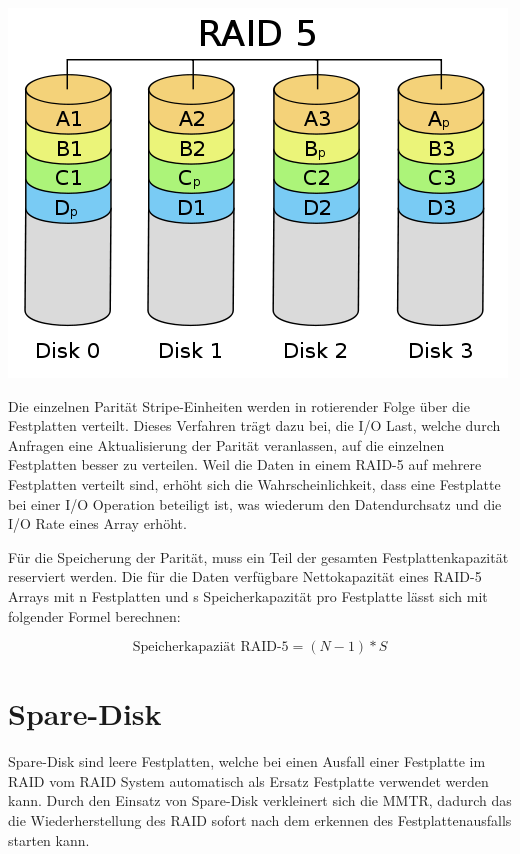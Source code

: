 \begin{center}
\includegraphics[width=\linewidth, keepaspectratio = true]{media/Raid-5.png}
\end{center}

Die einzelnen Parität Stripe-Einheiten werden in rotierender Folge über die Festplatten verteilt. Dieses Verfahren trägt dazu bei, die I/O Last, welche durch Anfragen eine Aktualisierung der Parität veranlassen, auf die einzelnen Festplatten besser zu verteilen. Weil die Daten in einem RAID-5 auf mehrere Festplatten verteilt sind, erhöht sich die Wahrscheinlichkeit, dass eine Festplatte bei einer I/O Operation beteiligt ist, was wiederum den Datendurchsatz und die I/O Rate eines Array erhöht. \cite{Kuratti1995}

Für die Speicherung der Parität, muss ein Teil der gesamten Festplattenkapazität reserviert werden. Die für die Daten verfügbare Nettokapazität eines RAID-5 Arrays mit n Festplatten und s Speicherkapazität pro Festplatte lässt sich mit folgender Formel \cite{Kuratti1995} berechnen:

\begin{equation}
\mbox{Speicherkapaziät RAID-5}=(N-1)*S
\label{eqn:MaxSpeicherkapazitätRAID5}
\end{equation}
 
\section{Spare-Disk}
Spare-Disk sind leere Festplatten, welche bei einen Ausfall einer Festplatte im RAID vom RAID System automatisch als Ersatz Festplatte verwendet werden kann. Durch den Einsatz von Spare-Disk verkleinert sich die MMTR, dadurch das die Wiederherstellung des RAID sofort nach dem erkennen des Festplattenausfalls starten kann. 

